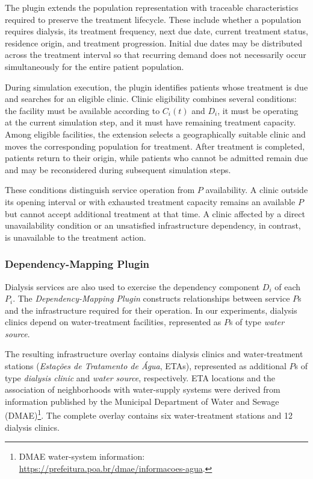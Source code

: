The plugin extends the population representation with traceable characteristics required to preserve the treatment lifecycle. These include whether a population requires dialysis, its treatment frequency, next due date, current treatment status, residence origin, and treatment progression. Initial due dates may be distributed across the treatment interval so that recurring demand does not necessarily occur simultaneously for the entire patient population.

During simulation execution, the plugin identifies patients whose treatment is due and searches for an eligible clinic. Clinic eligibility combines several conditions: the facility must be available according to $C_i(t)$ and $D_i$, it must be operating at the current simulation step, and it must have remaining treatment capacity. Among eligible facilities, the extension selects a geographically suitable clinic and moves the corresponding population for treatment. After treatment is completed, patients return to their origin, while patients who cannot be admitted remain due and may be reconsidered during subsequent simulation steps.

These conditions distinguish service operation from $P$ availability. A clinic outside its opening interval or with exhausted treatment capacity remains an available $P$ but cannot accept additional treatment at that time. A clinic affected by a direct unavailability condition or an unsatisfied infrastructure dependency, in contrast, is unavailable to the treatment action.

\subsubsection{Dependency-Mapping Plugin}
\label{sec:dependency_mapping_plugin_inputs}

Dialysis services are also used to exercise the dependency component $D_i$ of each $P_i$. The \textit{Dependency-Mapping Plugin} constructs relationships between service $P$s and the infrastructure required for their operation. In our experiments, dialysis clinics depend on water-treatment facilities, represented as $P$s of type \textit{water source}.

The resulting infrastructure overlay contains dialysis clinics and water-treatment stations (\textit{Estações de Tratamento de Água}, ETAs), represented as additional $P$s of type \textit{dialysis clinic} and \textit{water source}, respectively. ETA locations and the association of neighborhoods with water-supply systems were derived from information published by the Municipal Department of Water and Sewage (DMAE)\footnote{DMAE water-system information: \url{https://prefeitura.poa.br/dmae/informacoes-agua}.}. The complete overlay contains six water-treatment stations and 12 dialysis clinics.


